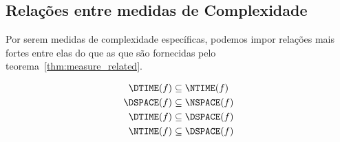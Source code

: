 \subsection{Relações entre medidas de Complexidade}
\label{sec:relations_between_measures}

Por serem medidas de complexidade específicas,
podemos impor relações mais fortes entre elas
do que as que são fornecidas pelo teorema~\ref{thm:measure_related}.

\begin{proposition}
    \begin{align}
        \DTIME(f) &\subseteq \NTIME(f) \label{eq:dtime_in_ntime} \\
        \DSPACE(f) &\subseteq \NSPACE(f) \label{eq:dspace_in_nspace} \\
        \DTIME(f) &\subseteq \DSPACE(f) \label{eq:dtime_in_dspace} \\
        \NTIME(f) &\subseteq \DSPACE(f) \label{eq:ntime_in_dspace}
    \end{align}
\end{proposition}

